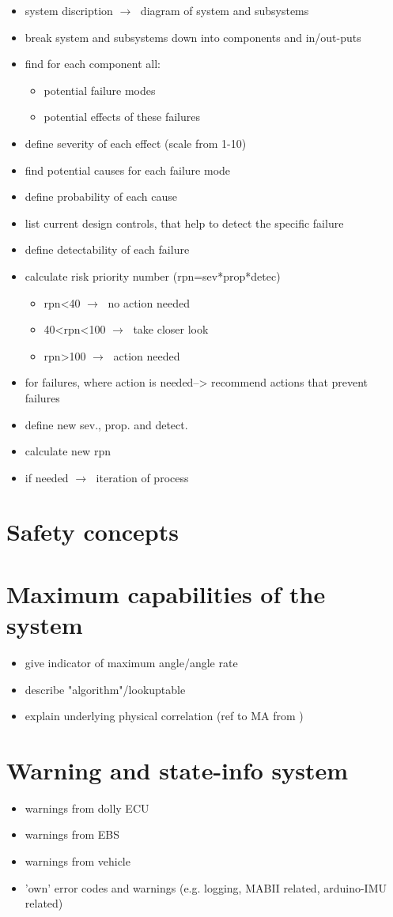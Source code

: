\documentclass[ExampleMasters.tex]{subfiles}
\begin{document}
\begin{itemize}
	\item system discription $\rightarrow\;$ diagram of system and subsystems
	\item break system and subsystems down into components and in/out-puts
	\item find for each component all:
	\begin{itemize}
		\item potential failure modes
		\item potential effects of these failures
	\end{itemize}
	\item define severity of each effect (scale from 1-10)
	\item find potential causes for each failure mode
	\item define probability of each cause
	\item list current design controls, that help to detect the specific failure
	\item define detectability of each failure
	\item calculate risk priority number (rpn=sev*prop*detec)
	\begin{itemize}
		\item rpn<40 $\rightarrow\;$ no action needed
		\item 40<rpn<100 $\rightarrow\;$ take closer look
		\item rpn>100 $\rightarrow\;$ action needed
	\end{itemize}
	\item for failures, where action is needed--> recommend actions that prevent failures
	\item define new sev., prop. and detect.
	\item calculate new rpn
	\item if needed $\rightarrow\;$ iteration of process    
\end{itemize}
\section{Safety concepts}
\label{sec:safetyconcepts}

\section{Maximum capabilities of the system}
\label{sec:maxi_capabilities}
\begin{itemize}
	\item give indicator of maximum angle/angle rate
	\item describe "algorithm"/lookuptable
	\item explain underlying physical correlation (ref to MA from )
\end{itemize}

\section{Warning and state-info system}
\label{sec:warning_system}
\begin{itemize}
	\item warnings from dolly ECU
	\item warnings from EBS
	\item warnings from vehicle
	\item 'own' error codes and warnings (e.g. logging, MABII related, arduino-IMU related)
\end{itemize}
\end{document}
